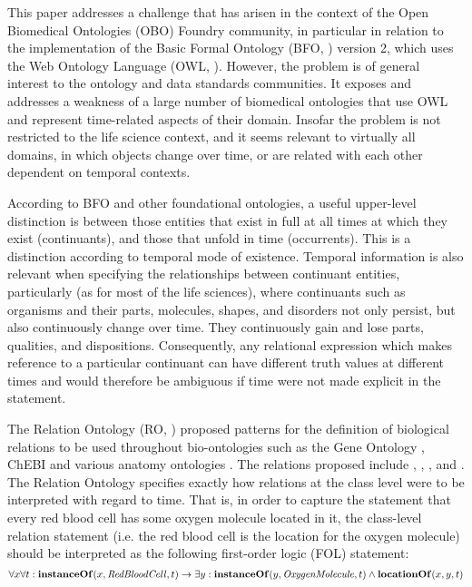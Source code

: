 


This paper addresses a challenge that has arisen in the context of the Open Biomedical Ontologies (OBO) Foundry \cite{Smith2007} community, in particular in relation to the implementation of the Basic Formal Ontology (BFO, \cite{BFO2:Graz}) version 2, which uses the Web Ontology Language (OWL, \cite{grau2008}). However, the problem is of general interest to the %
ontology and data standards communities. It exposes and addresses a weakness of a large number of biomedical ontologies that use OWL and represent time-related
aspects of their domain. Insofar the problem is not restricted to the life science context, and it seems relevant to virtually all domains, in which objects change over time, or are related with each other dependent on temporal contexts.   

According to BFO and other foundational ontologies, a useful upper-level distinction is between those entities that exist in full at all times at which they exist (continuants), and those that unfold in time (occurrents). This is a distinction according to temporal mode of existence. Temporal information is also relevant when specifying the relationships between continuant entities, particularly (as for most of the life sciences), where continuants such as organisms and their parts, molecules, shapes, and disorders not only persist, but also continuously change over time. They continuously gain and lose parts, qualities, and dispositions. Consequently, any relational expression which makes reference to a particular continuant can have different truth values at different times and would therefore be ambiguous if time were not made explicit in the statement. 

The Relation Ontology (RO, \cite{OBO:RO}) proposed patterns for the definition of biological relations to be used throughout bio-ontologies such as the Gene Ontology \cite{go2000}, ChEBI \cite{chebinar2013} and various anatomy ontologies \cite{uberon2012}. The relations proposed include , , , and  . The Relation Ontology specifies exactly how relations at the class level were to be interpreted with regard to time. That is, in order to capture the statement that every red blood cell has some oxygen molecule located in it, the class-level relation statement    (i.e. the red blood cell is the location for the oxygen molecule) should be interpreted as the following first-order logic (FOL) statement: 
\begin{equation}
\forall x \forall t : \mathrm{\mathbf{instanceOf}}(x, \mathit{RedBloodCell}, t) \rightarrow 
\exists y : \mathrm{\mathbf{instanceOf}}(y, \mathit{OxygenMolecule}, t) \wedge \mathrm{\mathbf{locationOf}}(x, y, t)
\end{equation}

